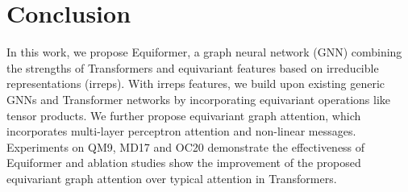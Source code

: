 \vspace{-5.0mm}
\section{Conclusion}
\vspace{-4mm}

In this work, we propose Equiformer, a graph neural network (GNN) combining the strengths of Transformers and equivariant features based on irreducible representations (irreps).
With irreps features, we build upon existing generic GNNs and Transformer networks by incorporating equivariant operations like tensor products.
We further propose equivariant graph attention, which incorporates multi-layer perceptron attention and non-linear messages.
Experiments on QM9, MD17 and OC20 demonstrate the effectiveness of Equiformer and ablation studies show the improvement of the proposed equivariant graph attention over typical attention in Transformers.

